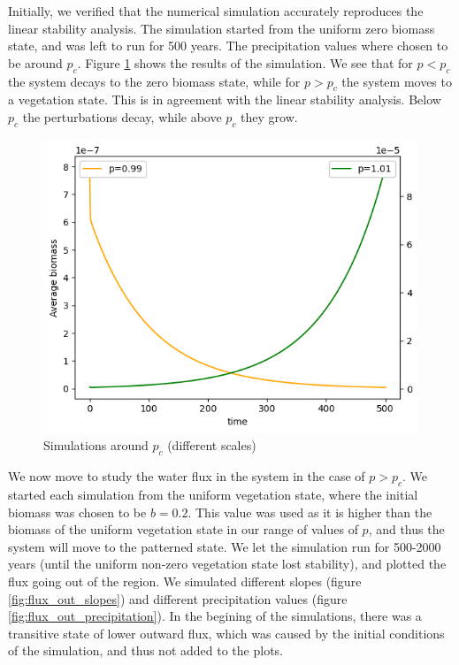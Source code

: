 \documentclass{article}
\numberwithin{equation}{section}
\begin{document}
Initially, we verified that the numerical simulation accurately reproduces the linear stability analysis.
The simulation started from the uniform zero biomass state, and was left to run for 500 years.
The precipitation values where chosen to be around $p_c$.
Figure \ref{fig:critical_point} shows the results of the simulation. We see that for $p<p_c$ the system decays to the zero biomass state, while for $p>p_c$ the system moves to a vegetation state. This is in agreement with the linear stability analysis. Below $p_c$ the perturbations decay, while above $p_c$ they grow.
\begin{figure}[!ht]
    \centering
    \includegraphics[scale=0.5]{plots/critical point.png}
    \caption{Simulations around $p_c$ (different scales)}
    \label{fig:critical_point}
\end{figure}

We now move to study the water flux in the system in the case of $p>p_c$.
We started each simulation from the uniform vegetation state, where the initial biomass was chosen to be $b=0.2$.
This value was used as it is higher than the biomass of the uniform vegetation state in our range of values of $p$, and thus the system will move to the patterned state.
We let the simulation run for 500-2000 years (until the uniform non-zero vegetation state lost stability), and plotted the flux going out of the region.
We simulated different slopes (figure \ref{fig:flux_out_slopes}) and different precipitation values (figure \ref{fig:flux_out_precipitation}).
In the begining of the simulations, there was a transitive state of lower outward flux, which was caused by the initial conditions of the simulation, and thus not added to the plots.
\end{document}
